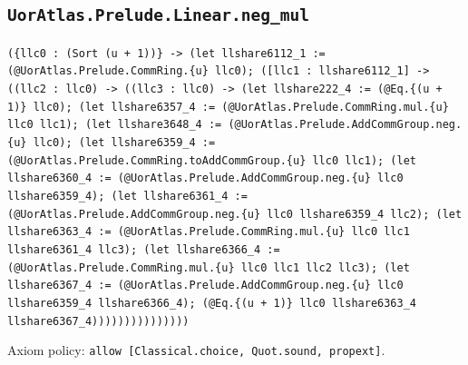 \documentclass[11pt]{article}
\begin{document}
\subsection*{\texttt{UorAtlas.Prelude.Linear.neg\_mul}}
\noindent\texttt{(\{llc0 : (Sort (u + 1))\} -> (let llshare6112\_1 := (@UorAtlas.Prelude.CommRing.\{u\} llc0); ([llc1 : llshare6112\_1] -> ((llc2 : llc0) -> ((llc3 : llc0) -> (let llshare222\_4 := (@Eq.\{(u + 1)\} llc0); (let llshare6357\_4 := (@UorAtlas.Prelude.CommRing.mul.\{u\} llc0 llc1); (let llshare3648\_4 := (@UorAtlas.Prelude.AddCommGroup.neg.\{u\} llc0); (let llshare6359\_4 := (@UorAtlas.Prelude.CommRing.toAddCommGroup.\{u\} llc0 llc1); (let llshare6360\_4 := (@UorAtlas.Prelude.AddCommGroup.neg.\{u\} llc0 llshare6359\_4); (let llshare6361\_4 := (@UorAtlas.Prelude.AddCommGroup.neg.\{u\} llc0 llshare6359\_4 llc2); (let llshare6363\_4 := (@UorAtlas.Prelude.CommRing.mul.\{u\} llc0 llc1 llshare6361\_4 llc3); (let llshare6366\_4 := (@UorAtlas.Prelude.CommRing.mul.\{u\} llc0 llc1 llc2 llc3); (let llshare6367\_4 := (@UorAtlas.Prelude.AddCommGroup.neg.\{u\} llc0 llshare6359\_4 llshare6366\_4); (@Eq.\{(u + 1)\} llc0 llshare6363\_4 llshare6367\_4)))))))))))))))}\par
\noindent Axiom policy: \texttt{allow [Classical.choice, Quot.sound, propext]}.\par
\end{document}
